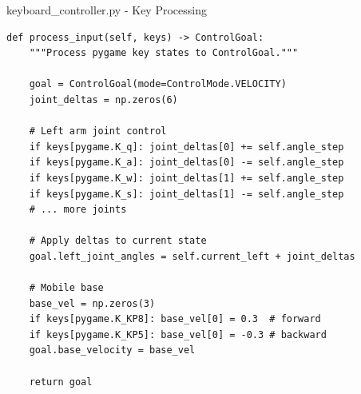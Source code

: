 \begin{frame}[fragile]{keyboard\_controller.py - Key Processing}
\begin{lstlisting}
def process_input(self, keys) -> ControlGoal:
    """Process pygame key states to ControlGoal."""

    goal = ControlGoal(mode=ControlMode.VELOCITY)
    joint_deltas = np.zeros(6)

    # Left arm joint control
    if keys[pygame.K_q]: joint_deltas[0] += self.angle_step
    if keys[pygame.K_a]: joint_deltas[0] -= self.angle_step
    if keys[pygame.K_w]: joint_deltas[1] += self.angle_step
    if keys[pygame.K_s]: joint_deltas[1] -= self.angle_step
    # ... more joints

    # Apply deltas to current state
    goal.left_joint_angles = self.current_left + joint_deltas

    # Mobile base
    base_vel = np.zeros(3)
    if keys[pygame.K_KP8]: base_vel[0] = 0.3  # forward
    if keys[pygame.K_KP5]: base_vel[0] = -0.3 # backward
    goal.base_velocity = base_vel

    return goal
\end{lstlisting}
\end{frame}

